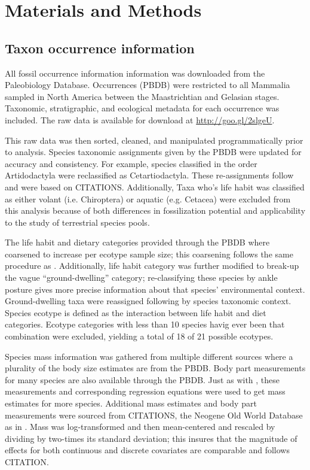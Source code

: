 \documentclass[12pt,letterpaper]{article}
\begin{document}
\section*{Materials and Methods}

\subsection*{Taxon occurrence information}
All fossil occurrence information information was downloaded from the Paleobiology Database. Occurrences (PBDB) were restricted to all Mammalia sampled in North America between the Maastrichtian and Gelasian stages. Taxonomic, stratigraphic, and ecological metadata for each occurrence was included. The raw data is available for download at \url{http://goo.gl/2slgeU}.

This raw data was then sorted, cleaned, and manipulated programmatically prior to analysis. Species taxonomic assignments given by the PBDB were updated for accuracy and consistency. For example, species classified in the order Artidodactyla were reclassified as Cetartiodactyla. These re-assignments follow \citet{Smits2015} and were based on CITATIONS. Additionally, Taxa who's life habit was classified as either volant (i.e. Chiroptera) or aquatic (e.g. Cetacea) were excluded from this analysis because of both differences in fossilization potential and applicability to the study of terrestrial species pools.

The life habit and dietary categories provided through the PBDB where coarsened to increase per ecotype sample size; this coarsening follows the same procedure as \citet{Smits2015}. Additionally, life habit category was further modified to break-up the vague ``ground-dwelling'' category; re-classifying these species by ankle posture gives more precise information about that species' environmental context. Ground-dwelling taxa were reassigned following \citet{Carrano1997} by species taxonomic context. Species ecotype is defined as the interaction between life habit and diet categories. Ecotype categories with less than 10 species havig ever been that combination were excluded, yielding a total of 18 of 21 possible ecotypes. %

Species mass information was gathered from multiple different sources where a plurality of the body size estimates are from the PBDB. Body part measurements for many species are also available through the PBDB. Just as with \citet{Smits2015}, these measurements and corresponding regression equations were used to get mass estimates for more species. Additional mass estimates and body part measurements were sourced from CITATIONS, the Neogene Old World Database as in \citet{Smits2015}. Mass was log-transformed and then mean-centered and rescaled by dividing by two-times its standard deviation; this insures that the magnitude of effects for both continuous and discrete covariates are comparable and follows CITATION. %
\end{document}
